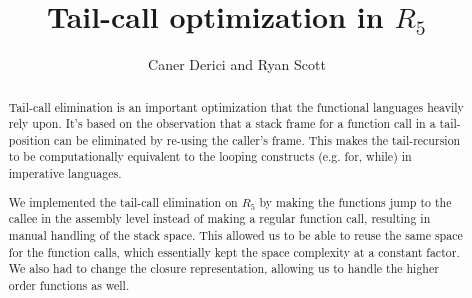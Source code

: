 \documentclass[12pt]{article}
\begin{document}
%
%
%
%
%
%
%
%

\title{Tail-call optimization in $R_5$\vspace{-2ex}}
\author{Caner Derici and Ryan Scott} 
 
\maketitle

\begin{abstract}
  Tail-call elimination is an important optimization that the
  functional languages heavily rely upon. It's based on the
  observation that a stack frame for a function call in a
  tail-position can be eliminated by re-using the caller's frame. This
  makes the tail-recursion to be computationally equivalent to the
  looping constructs (e.g. for, while) in imperative languages.

  We implemented the tail-call elimination on $R_5$ by making the
  functions jump to the callee in the assembly level instead of making
  a regular function call, resulting in manual handling of the stack
  space. This allowed us to be able to reuse the same space for the
  function calls, which essentially kept the space complexity at a
  constant factor. We also had to change the closure representation,
  allowing us to handle the higher order functions as well.
\end{abstract}
\end{document}
